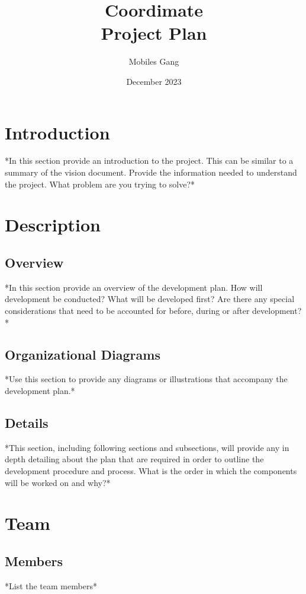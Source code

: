 \documentclass{article}
\title{Coordimate\\Project Plan}
\date{December 2023}
\author{Mobiles Gang}
\begin{document}
\maketitle

\section{Introduction}

*In this section provide an introduction to the project. This can be similar to
a summary of the vision document. Provide the information needed to understand
the project. What problem are you trying to solve?*

\section{Description}

\subsection{Overview} *In this section provide an overview of the development
plan. How will development be conducted? What will be developed first? Are
there any special considerations that need to be accounted for before, during
or after development?*

\subsection{Organizational Diagrams} *Use this section to provide any diagrams
or illustrations that accompany the development plan.*

\subsection{Details} *This section, including following sections and
subsections, will provide any in depth detailing about the plan that are
required in order to outline the development procedure and process. What is the
order in which the components will be worked on and why?*

\section{Team}

\subsection{Members} *List the team members*
\end{document}
